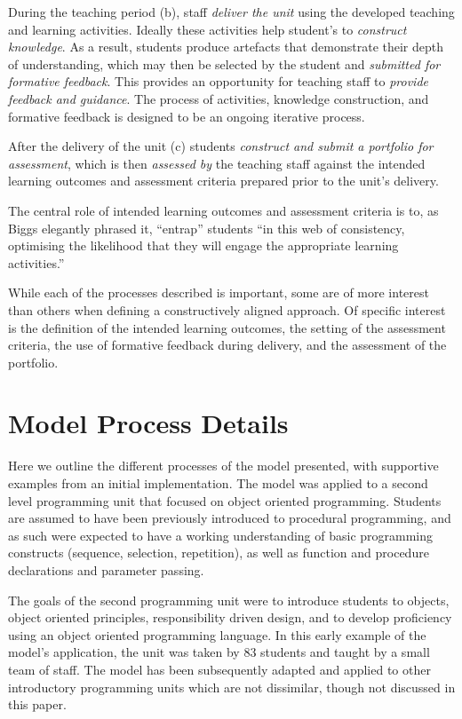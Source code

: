 During the teaching period (b), staff \emph{deliver the unit} using the developed teaching and learning activities. Ideally these activities help student's to \emph{construct knowledge}. As a result, students produce artefacts that demonstrate their depth of understanding, which may then be selected by the student and \emph{submitted for formative feedback}. This provides an opportunity for teaching staff to \emph{provide feedback and guidance}. The process of activities, knowledge construction, and formative feedback is designed to be an ongoing iterative process.

After the delivery of the unit (c) students \emph{construct and submit a portfolio for assessment}, which is then \emph{assessed by} the teaching staff against the intended learning outcomes and assessment criteria prepared prior to the unit's delivery.

The central role of intended learning outcomes and assessment criteria is to, as Biggs elegantly phrased it, ``entrap'' students ``in this web of consistency, optimising the likelihood that they will engage the appropriate learning activities.''~\cite{Biggs:1999}

While each of the processes described is important, some are of more interest than others when defining a constructively aligned approach. Of specific interest is the definition of the intended learning outcomes, the setting of the assessment criteria, the use of formative feedback during delivery, and the assessment of the portfolio.

\section{Model Process Details} %
\label{sec:process_details}

Here we outline the different processes of the model presented, with supportive examples from an initial implementation. The model was applied to a second level programming unit that focused on object oriented programming. Students are assumed to have been previously introduced to procedural programming, and as such were expected to have a working understanding of basic programming constructs (sequence, selection, repetition), as well as function and procedure declarations and parameter passing. 

The goals of the second programming unit were to introduce students to objects, object oriented principles, responsibility driven design, and to develop proficiency using an object oriented programming language. In this early example of the model's application, the unit was taken by 83 students and taught by a small team of staff. The model has been subsequently adapted and applied to other introductory programming units which are not dissimilar, though not discussed in this paper.

